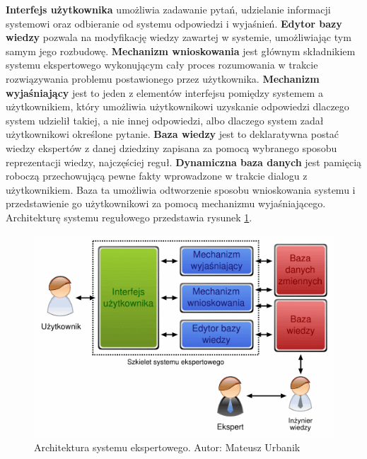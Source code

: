 \textbf{Interfejs użytkownika} umożliwia zadawanie pytań, udzielanie informacji systemowi oraz odbieranie od systemu odpowiedzi i wyjaśnień.
\textbf{Edytor bazy wiedzy} pozwala na modyfikację wiedzy zawartej w systemie, umożliwiając tym samym jego rozbudowę.
\textbf{Mechanizm wnioskowania} jest głównym składnikiem systemu ekspertowego wykonującym cały proces rozumowania w trakcie rozwiązywania problemu postawionego przez użytkownika.
\textbf{Mechanizm wyjaśniający} jest to jeden z elementów interfejsu pomiędzy systemem a użytkownikiem, który umożliwia użytkownikowi uzyskanie odpowiedzi dlaczego system udzielił takiej, a nie innej odpowiedzi, albo dlaczego system zadał użytkownikowi określone pytanie.
\textbf{Baza wiedzy} jest to deklaratywna postać wiedzy ekspertów z danej dziedziny zapisana za pomocą wybranego sposobu reprezentacji wiedzy, najczęściej reguł.
\textbf{Dynamiczna baza danych} jest pamięcią roboczą przechowującą pewne fakty wprowadzone w trakcie dialogu z użytkownikiem. Baza ta umożliwia odtworzenie sposobu wnioskowania systemu i przedstawienie go użytkownikowi za pomocą mechanizmu wyjaśniającego\cite{martyniuk_ekspertowe}.
Architekturę systemu regułowego przedstawia rysunek \ref{img:rysunek_expert}.
\begin{figure}[!ht]
\centering	
\includegraphics[scale=0.5]{images/expert-system}
\caption[Rysunek przedstawiający model architektury systemu ekspertowego]{Architektura systemu ekspertowego. Autor: Mateusz Urbanik}
\label{img:rysunek_expert}
\end{figure}

